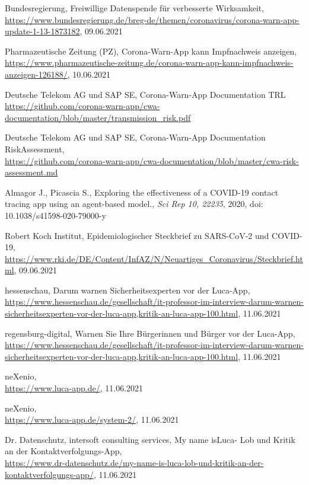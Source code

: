 \documentclass[conference,compsoc]{IEEEtran}
\begin{document}
\begin{thebibliography}{00}
 Bundesregierung, \glqq Freiwillige Datenspende für verbesserte Wirksamkeit\grqq, \\\url{https://www.bundesregierung.de/breg-de/themen/coronavirus/corona-warn-app-update-1-13-1873182}, 09.06.2021

 Pharmazeutische Zeitung (PZ), \glqq Corona-Warn-App kann Impfnachweis anzeigen\grqq,
\url{https://www.pharmazeutische-zeitung.de/corona-warn-app-kann-impfnachweis-anzeigen-126188/}, 10.06.2021

 Deutsche Telekom AG und SAP SE, \glqq Corona-Warn-App Documentation TRL\grqq \\\url{https://github.com/corona-warn-app/cwa-documentation/blob/master/transmission_risk.pdf}

 Deutsche Telekom AG und SAP SE, \glqq Corona-Warn-App Documentation RiskAssessment\grqq, \\\url{https://github.com/corona-warn-app/cwa-documentation/blob/master/cwa-risk-assessment.md}

 Almagor J., Picascia S., \glqq Exploring the effectiveness of a COVID-19 contact tracing app using an agent-based model.\grqq, \textit{Sci Rep 10, 22235}, 2020, doi: 10.1038/s41598-020-79000-y

 Robert Koch Institut, \glqq Epidemiologischer Steckbrief zu SARS-CoV-2 und COVID-19\grqq, \\\url{https://www.rki.de/DE/Content/InfAZ/N/Neuartiges\_Coronavirus/Steckbrief.html}, 09.06.2021

 hessenschau, \glqq Darum warnen Sicherheitsexperten vor der Luca-App\grqq, \\\url{https://www.hessenschau.de/gesellschaft/it-professor-im-interview-darum-warnen-sicherheitsexperten-vor-der-luca-app,kritik-an-luca-app-100.html}, 11.06.2021

 regensburg-digital, \glqq Warnen Sie Ihre Bürgerinnen und Bürger vor der Luca-App\grqq, \\\url{https://www.hessenschau.de/gesellschaft/it-professor-im-interview-darum-warnen-sicherheitsexperten-vor-der-luca-app,kritik-an-luca-app-100.html}, 11.06.2021

 neXenio, \\\url{https://www.luca-app.de/}, 11.06.2021

 neXenio, \\\url{https://www.luca-app.de/system-2/}, 11.06.2021

 Dr. Datenschutz, intersoft consulting services, \glqq My name is\glqq Luca\grqq - Lob und Kritik an der Kontaktverfolgungs-App\grqq, \\\url{https://www.dr-datenschutz.de/my-name-is-luca-lob-und-kritik-an-der-kontaktverfolgungs-app/}, 11.06.2021 

\end{thebibliography}
\vspace{12pt}
\end{document}
